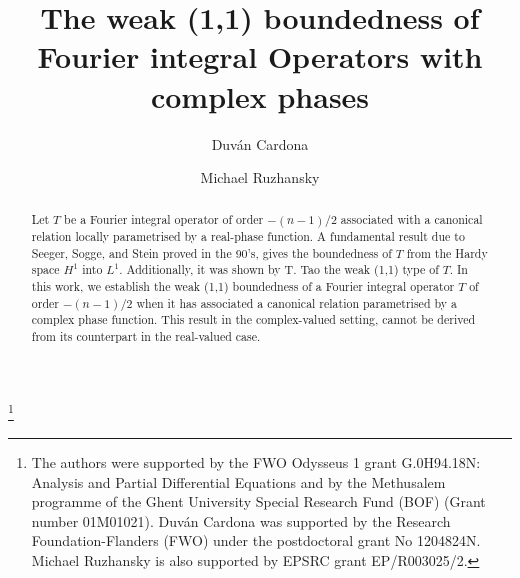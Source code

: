 \documentclass[12pt, reqno]{amsart}
\theoremstyle{definition}
\theoremstyle{remark}
\numberwithin{equation}{section}
\begin{document}
\setcounter{page}{1}

\title[Weak (1,1) boundedness of FIOs with complex phases]{The weak (1,1) boundedness of Fourier integral Operators with complex phases}

\author[D. Cardona]{Duv\'an Cardona}
\address{
  Duv\'an Cardona:
  \endgraf
  Department of Mathematics: Analysis, Logic and Discrete Mathematics
  \endgraf
  Ghent University, Belgium
  \endgraf
  {\it E-mail address} {\rm duvanc306@gmail.com, duvan.cardonasanchez@ugent.be}
  }
  
 

\author[M. Ruzhansky]{Michael Ruzhansky}
\address{
  Michael Ruzhansky:
  \endgraf
  Department of Mathematics: Analysis, Logic and Discrete Mathematics
  \endgraf
  Ghent University, Belgium
  \endgraf
 and
  \endgraf
  School of Mathematical Sciences
  \endgraf
  Queen Mary University of London
  \endgraf
  United Kingdom
  \endgraf
  {\it E-mail address} {\rm michael.ruzhansky@ugent.be, m.ruzhansky@qmul.ac.uk}
  }



\thanks{The authors were supported  by the FWO  Odysseus  1  grant  G.0H94.18N:  Analysis  and  Partial Differential Equations and  by the Methusalem programme of the Ghent University Special Research Fund (BOF)
(Grant number 01M01021). Duv\'an Cardona was supported by the Research Foundation-Flanders
(FWO) under the postdoctoral
grant No 1204824N.  Michael Ruzhansky is also supported  by EPSRC grant 
EP/R003025/2.
}


\begin{abstract} Let $T$ be a Fourier integral operator of order $-(n-1)/2$ associated with a canonical relation locally parametrised by a real-phase function. A fundamental result due to Seeger, Sogge, and Stein proved in the 90's, gives the boundedness of $T$  from the Hardy space $H^1$ into $L^1.$ Additionally,   it was shown by  T. Tao the weak (1,1) type of $T$.  In this work, we establish the weak (1,1) boundedness of a Fourier integral operator $T$ of order $-(n-1)/2$ when it has associated a canonical relation parametrised by a complex phase function. This result in the complex-valued setting, cannot be derived from its counterpart in the real-valued case.
\end{abstract} 

\maketitle
\end{document}
